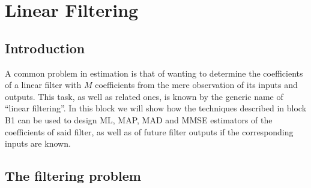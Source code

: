 \newcommand{\x}{{\mathbf x}}
\newcommand{\s}{{\mathbf s}}
\newcommand{\uu}{{\mathbf u}}
\newcommand{\UU}{{\mathbf U}}
\newcommand{\PP}{{\mathbf P}}
\newcommand{\Ruu}{{\mathbf R}_{uu}}
\newcommand{\rux}{{\mathbf r}_{ux}}
\newcommand{\hRuu}{\hat{\mathbf R}_{uu}}
\newcommand{\hrux}{\hat {\mathbf r}_{ux}}


\newcommand{\pp}{{\mathbf r}}
\newcommand{\eye}{{\mathbf I}}
\newcommand{\Normal	}{{\mathcal N}}
\newcommand{\bigO	}{{\mathcal O}}

\newcommand{\argmax}[1]{\underset{#1}{\operatorname{argmax}}~}  %
\newcommand{\argmin}[1]{\underset{#1}{\operatorname{argmin}}~}


\chapter{Linear Filtering}
\label{cha:FiltradoLinea}

\section{Introduction}

A common problem in estimation is that of wanting to determine the coefficients of a linear filter with $M$ coefficients from the mere observation of its inputs and outputs. This task, as well as related ones, is known by the generic name of ``linear filtering''. In this block we will show how the techniques described in block B1 can be used to design ML, MAP, MAD and MMSE estimators of the coefficients of said filter, as well as of future filter outputs if the corresponding inputs are known.


\section{The filtering problem}

